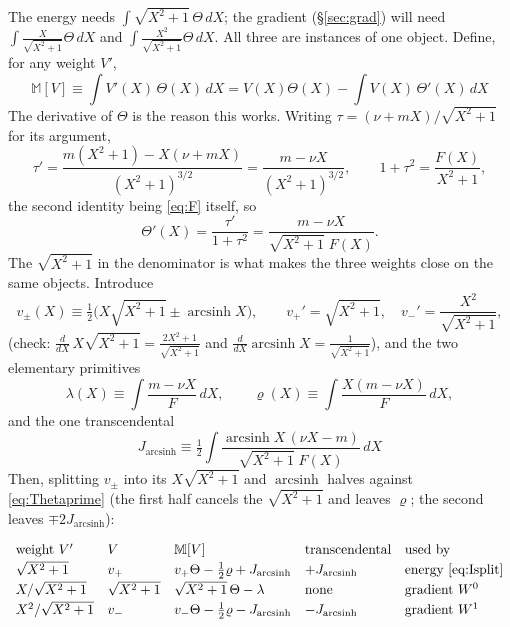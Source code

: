 \documentclass[11pt]{article}
\numberwithin{equation}{section}
\newcommand{\half}{\tfrac{1}{2}}
\DeclareMathOperator{\arcsinh}{arcsinh}
\begin{document}
The energy needs $\int\sqrt{X^2+1}\,\Theta\,dX$; the gradient (\S\ref{sec:grad}) will need
$\int\frac{X}{\sqrt{X^2+1}}\Theta\,dX$ and $\int\frac{X^2}{\sqrt{X^2+1}}\Theta\,dX$. All three are
instances of one object. Define, for any weight $V'$,
\begin{equation}\label{eq:master}
  \boxed{\;\mathbb M[V]\equiv\int V'(X)\,\Theta(X)\,dX=V(X)\Theta(X)-\int V(X)\,\Theta'(X)\,dX\;}
\end{equation}
The derivative of $\Theta$ is the reason this works. Writing $\tau=(\nu+mX)/\sqrt{X^2+1}$ for its
argument,
\[
  \tau'=\frac{m(X^2+1)-X(\nu+mX)}{(X^2+1)^{3/2}}=\frac{m-\nu X}{(X^2+1)^{3/2}},\qquad
  1+\tau^2=\frac{F(X)}{X^2+1},
\]
the second identity being \eqref{eq:F} itself, so
\begin{equation}\label{eq:Thetaprime}
  \Theta'(X)=\frac{\tau'}{1+\tau^2}=\frac{m-\nu X}{\sqrt{X^2+1}\;F(X)} .
\end{equation}
The $\sqrt{X^2+1}$ in the denominator is what makes the three weights close on the same objects.
Introduce
\begin{equation}\label{eq:vpm}
  v_\pm(X)\equiv\half\Big(X\sqrt{X^2+1}\pm\arcsinh X\Big),\qquad
  v_+'=\sqrt{X^2+1},\quad v_-'=\frac{X^2}{\sqrt{X^2+1}},
\end{equation}
(check: $\frac{d}{dX}\,X\sqrt{X^2+1}=\frac{2X^2+1}{\sqrt{X^2+1}}$ and
$\frac{d}{dX}\arcsinh X=\frac{1}{\sqrt{X^2+1}}$), and the two elementary primitives
\begin{equation}\label{eq:lamrho}
  \lambda(X)\equiv\int\frac{m-\nu X}{F}\,dX,\qquad
  \varrho(X)\equiv\int\frac{X(m-\nu X)}{F}\,dX,
\end{equation}
and the one transcendental
\begin{equation}\label{eq:Jdef}
  \boxed{\;J_{\arcsinh}\equiv\half\int\frac{\arcsinh X\,(\nu X-m)}{\sqrt{X^2+1}\;F(X)}\,dX\;}
\end{equation}
Then, splitting $v_\pm$ into its $X\sqrt{X^2+1}$ and $\arcsinh$ halves against \eqref{eq:Thetaprime}
(the first half cancels the $\sqrt{X^2+1}$ and leaves $\varrho$; the second leaves $\mp2J_{\arcsinh}$):

\begin{equation}\label{eq:mastertable}
  \begin{array}{lllll}
    \text{weight }V' & V & \mathbb M[V] & \text{transcendental} & \text{used by}\\[2pt]
    \sqrt{X^2+1} & v_+ & v_+\Theta-\half\varrho+J_{\arcsinh} & +J_{\arcsinh} & \text{energy }\eqref{eq:Isplit}\\[2pt]
    X/\sqrt{X^2+1} & \sqrt{X^2+1} & \sqrt{X^2+1}\,\Theta-\lambda & \text{none} & \text{gradient }W^0\\[2pt]
    X^2/\sqrt{X^2+1} & v_- & v_-\Theta-\half\varrho-J_{\arcsinh} & -J_{\arcsinh} & \text{gradient }W^1
  \end{array}
\end{equation}
\end{document}
